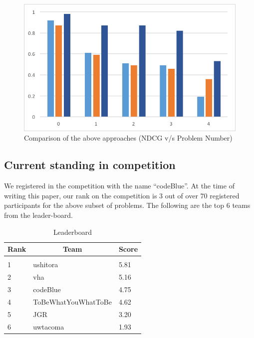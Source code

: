 \documentclass[letterpaper]{article}
\begin{document}
\begin{figure}[h]
	\includegraphics[scale=0.6]{"results"}
	\caption{Comparison of the above approaches (NDCG v/s Problem Number)}
\end{figure}

\subsection{Current standing in competition}

We registered in the competition with the name \enquote{codeBlue}. At the time of writing this paper, our rank on the competition is 3 out of over 70 registered participants for the above subset of problems. The following are the top 6 teams from the leader-board.

\begin{table}[h]
	\caption{Leaderboard}
	\label{table:leaderboard}
	\begin{center}
		\begin{tabular}{lll}
			\multicolumn{1}{c}{\bf Rank} & \multicolumn{1}{c}{\bf Team} & \multicolumn{1}{c}{\bf Score} \\
			\hline \\
			1                            & ushitora                     & 5.81                          \\
			2                            & vha                          & 5.16                          \\
			3                            & codeBlue                     & 4.75                          \\
			4                            & ToBeWhatYouWhatToBe          & 4.62                          \\
			5                            & JGR                          & 3.20                          \\
			6                            & uwtacoma                     & 1.93                          \\
		\end{tabular}
	\end{center}
\end{table}
\end{document}
